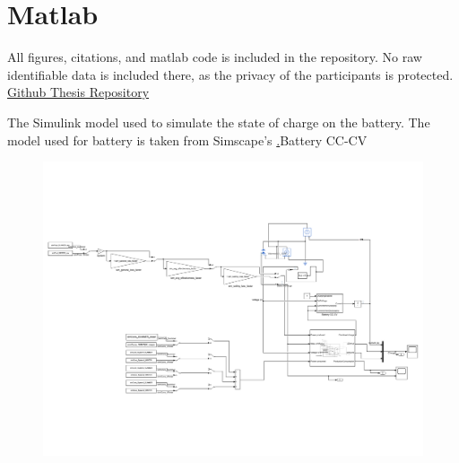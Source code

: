\chapter{Matlab}
\label{apx:matlab}
All figures, citations, and matlab code is included in the repository. No raw identifiable data is included there, as the privacy of the participants is protected. 
\href{https://github.com/Jodlar98/MasterMedMening}{Github Thesis Repository}

The Simulink model used to simulate the state of charge on the battery. The model used for battery is taken from Simscape's \href{https://se.mathworks.com/help/simscape-battery/ref/batterycccv.html}.{Battery CC-CV}
\begin{figure}[H]
    \centering
    \includegraphics[width=\linewidth]{photos/Simulink.pdf}
\end{figure}